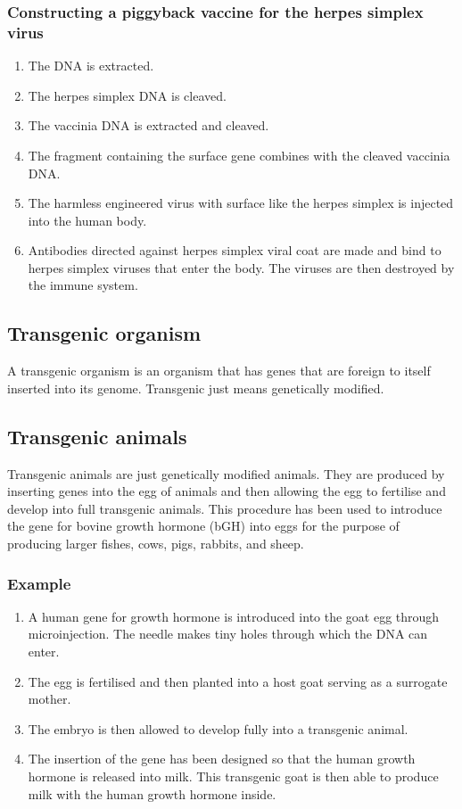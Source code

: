 \documentclass[11pt]{article}
\begin{document}
\subsubsection{Constructing a piggyback vaccine for the herpes simplex virus}
\label{sec:orgc5b2432}
\begin{enumerate}
\item The DNA is extracted.
\item The herpes simplex DNA is cleaved.
\item The vaccinia DNA is extracted and cleaved.
\item The fragment containing the surface gene combines with the cleaved vaccinia DNA.
\item The harmless engineered virus with surface like the herpes simplex is injected into the human body.
\item Antibodies directed against herpes simplex viral coat are made and bind to herpes simplex viruses that enter the body. The viruses are then destroyed by the immune system.
\end{enumerate}

\subsection{Transgenic organism}
\label{sec:orgcafa54c}
A transgenic organism is an organism that has genes that are foreign to itself inserted into its genome. Transgenic just means genetically modified.

\subsection{Transgenic animals}
\label{sec:org77128a4}
Transgenic animals are just genetically modified animals. They are produced by inserting genes into the egg of animals and then allowing the egg to fertilise and develop into full transgenic animals. This procedure has been used to introduce the gene for bovine growth hormone (bGH) into eggs for the purpose of producing larger fishes, cows, pigs, rabbits, and sheep.

\subsubsection{Example}
\label{sec:org4cef5b2}
\begin{enumerate}
\item A human gene for growth hormone is introduced into the goat egg through microinjection. The needle makes tiny holes through which the DNA can enter.
\item The egg is fertilised and then planted into a host goat serving as a surrogate mother.
\item The embryo is then allowed to develop fully into a transgenic animal.
\item The insertion of the gene has been designed so that the human growth hormone is released into milk. This transgenic goat is then able to produce milk with the human growth hormone inside.
\end{enumerate}
\end{document}
